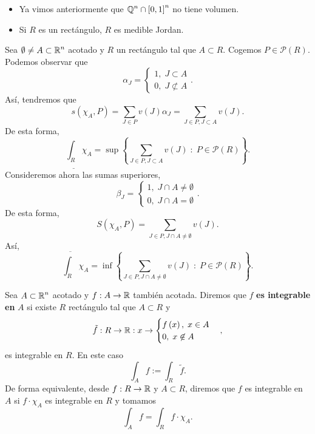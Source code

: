 \begin{eg}
\begin{itemize}
\item Ya vimos anteriormente que $\displaystyle \mathbb{Q}^{n} \cap \left[0,1\right] ^{n} $ no tiene volumen.
\item Si $\displaystyle R $ es un rectángulo, $\displaystyle R $ es medible Jordan.
\end{itemize}

	\end{eg}
\begin{observation}
Sea $\displaystyle \emptyset \neq A \subset \mathbb{R}^{n} $ acotado y $\displaystyle R $ un rectángulo tal que $\displaystyle A \subset R $. Cogemos $\displaystyle P \in \mathcal{P}\left(R\right) $. Podemos observar que 
\[\alpha_{J} = 
\begin{cases}
1, \; J \subset A \\
0, \; J \not\subset A
\end{cases}
.\]
Así, tendremos que 
\[s\left(\chi_{A}, P\right) = \sum_{J \in P}v\left(J\right)\alpha_{J} = \sum_{J \in P, J \subset A}v\left(J\right).\]
De esta forma,
\[\underline{\int _{R}} \chi_{A} = \sup \left\{ \sum_{J \in P, J \subset A}v\left(J\right) \; : \; P \in \mathcal{P}\left(R\right)\right\} .\]
Consideremos ahora las sumas superiores,
\[\beta_{J} = 
\begin{cases}
1, \; J \cap A \neq \emptyset \\
0, \; J \cap A = \emptyset
\end{cases}
.\]
De esta forma,
\[S\left(\chi_{A}, P\right) = \sum_{J \in P, J \cap A \neq \emptyset}v\left(J\right) .\]
Así, 
\[\overline{\int _{R} }\chi_{A} = \inf \left\{\sum_{J \in P, J \cap A \neq \emptyset}v\left(J\right)\; : \; P \in \mathcal{P}\left(R\right) \right\}  .\]
\end{observation}

\begin{definition}
Sea $\displaystyle A \subset \mathbb{R}^{n} $ acotado y $\displaystyle f : A \to \mathbb{R} $ también acotada. Diremos que $\displaystyle f $ \textbf{es integrable en} $\displaystyle A $ si existe $\displaystyle R $ rectángulo tal que $\displaystyle A \subset R $ y 
\[\tilde{f} : R \to \mathbb{R} : x \to 
\begin{cases}
f\left(x\right), \; x \in A \\
0, \; x \not\in A
\end{cases}
,\]
es integrable en $\displaystyle R $. En este caso
\[\int _{A}f := \int _{R}\tilde{f}  .\]
De forma equivalente, desde $\displaystyle f : R \to \mathbb{R} $ y $\displaystyle A \subset R $, diremos que $\displaystyle f $ es integrable en $\displaystyle A $ si $\displaystyle f \cdot \chi_{A} $ es integrable en $\displaystyle R $ y tomamos
\[\int _{A}f = \int _{R}f \cdot \chi_{A}  .\]
\end{definition}

